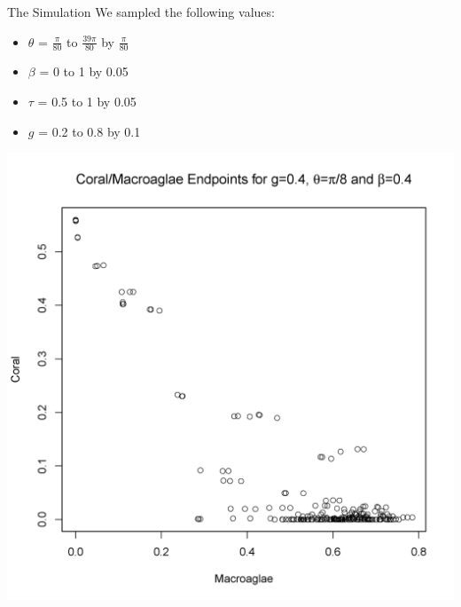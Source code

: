\begin{frame}{The Simulation}
We sampled the following values:
\begin{itemize}
\item $\theta$ = $\frac{\pi}{80}$ to $\frac{39\pi}{80}$ by $\frac{\pi}{80}$\\
\item $\beta$ = 0 to 1 by 0.05\\
\item $\tau$ = 0.5 to 1 by 0.05\\
\item $g$ = 0.2 to 0.8 by 0.1\\
\end{itemize}
\end{frame}


\begin{frame}
\includegraphics[scale=.325]{scatter_lgcoral_gpt4_betapt4_theta10.png}
\end{frame}

